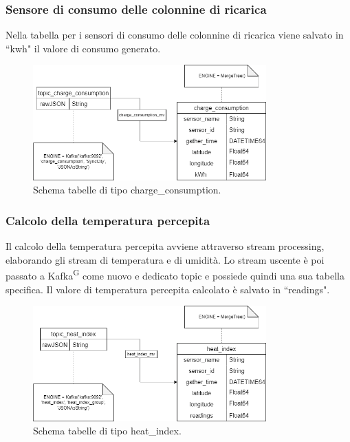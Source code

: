 \documentclass[8pt]{article}
\newcommand{\glossterm}[1]{#1\textsuperscript{G}} %
\begin{document}
\subsubsection{Sensore di consumo delle colonnine di ricarica}
Nella tabella per i sensori di consumo delle colonnine di ricarica viene salvato in ``kwh" il valore di consumo generato.
\begin{figure}[h!]
    \centering
    \includegraphics[width=0.8\textwidth]{images_st/tabelle_charge_consumption.png}
    \caption{Schema tabelle di tipo charge\_consumption.}
    \label{fig:Schema tabelle di tipo charge_consumption}
\end{figure}
\subsubsection{Calcolo della temperatura percepita}
Il calcolo della temperatura percepita avviene attraverso stream processing, elaborando gli stream di temperatura e di umidità. Lo stream uscente è poi passato a \glossterm{Kafka} come nuovo e dedicato topic e possiede quindi una sua tabella specifica. Il valore di temperatura percepita calcolato è salvato in ``readings".
\begin{figure}[h!]
    \centering
    \includegraphics[width=0.8\textwidth]{images_st/tabelle_heat_index.png}
    \caption{Schema tabelle di tipo heat\_index.}
    \label{fig:Schema tabelle di tipo heat_index}
\end{figure}
\clearpage
\end{document}
